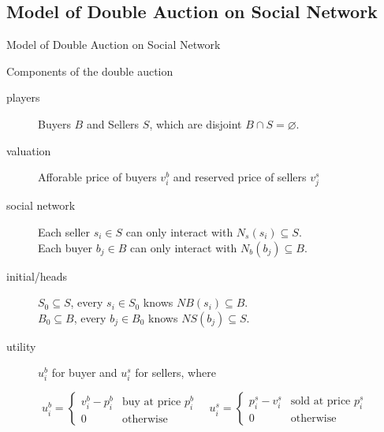 \documentclass{beamer}
\begin{document}
\subsection{Model of Double Auction on Social Network}
\begin{frame}{Model of Double Auction on Social Network}
	\begin{block}{Components of the double auction}
		\begin{description}
			\item[players] Buyers $B$ and Sellers $S$, which are disjoint $B\cap S=\varnothing$.
			\item[valuation] Afforable price of buyers $v^b_i$ and reserved price of sellers $v^s_j$
			\item[social network]
				Each seller $s_i\in S$ can only interact with $N_s(s_i) \subseteq S$.\\
				Each buyer $b_j\in B$ can only interact with $N_b(b_j) \subseteq B$.
			\item[initial/heads] $S_0\subseteq S$, every $s_i\in S_0$ knows $NB(s_i) \subseteq B$.\\
				$B_0\subseteq B$, every $b_j\in B_0$ knows $NS(b_j) \subseteq S$.
			\item[utility] $u^b_i$ for buyer and $u^s_i$ for sellers, where
		\end{description}
		\[
			u^b_i = \begin{cases}
				v^b_i - p^b_i & \text{buy at price $p^b_i$} \\
				0             & \text{otherwise}
			\end{cases}
			\quad
			u^s_i = \begin{cases}
				p^s_i - v^s_i & \text{sold at price $p^s_i$} \\
				0             & \text{otherwise}
			\end{cases}
		\]
	\end{block}
\end{frame}
\end{document}
